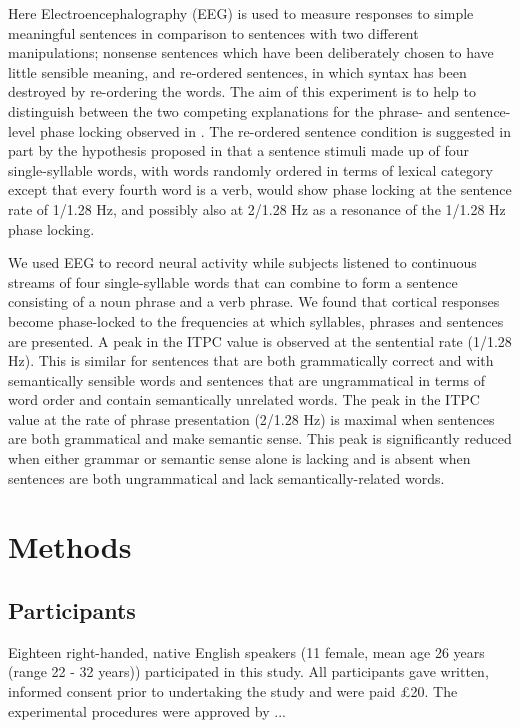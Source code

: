 \documentclass[10pt,letterpaper]{article}
\begin{document}
Here Electroencephalography (EEG) is used to measure responses to
simple meaningful sentences in comparison to sentences with two different
manipulations; nonsense sentences which have been deliberately chosen
to have little sensible meaning, and re-ordered sentences, in which
syntax has been destroyed by re-ordering the words. The aim of this
experiment is to help to distinguish between the two competing
explanations for the phrase- and sentence-level phase locking observed
in \cite{DingEtAl2016,DingEtAl2017}. The re-ordered sentence condition
is suggested in part by the hypothesis proposed in
\cite{FrankYang2018} that a sentence stimuli made up of four
single-syllable words, with words randomly ordered in terms of lexical
category except that every fourth word is a verb, would show phase
locking at the sentence rate of 1/1.28 Hz, and possibly also at 2/1.28
Hz as a resonance of the 1/1.28 Hz phase locking.



We used EEG to record neural activity while subjects listened to continuous streams of four single-syllable words that can combine to form a sentence consisting of a noun phrase and a verb phrase. We found that cortical responses become
phase-locked to the frequencies at which syllables, phrases and
sentences are presented. A peak in the ITPC value is observed at the sentential rate
(1/1.28 Hz). This is similar for sentences that are both grammatically correct and with semantically sensible words and sentences that are
ungrammatical in terms of word order and contain semantically
 unrelated words. The peak in the ITPC value at the rate of phrase presentation
 (2/1.28 Hz) is maximal when sentences are both grammatical and make
 semantic sense. This peak is significantly reduced when either grammar or
 semantic sense alone is lacking and is absent when sentences are both ungrammatical and
 lack semantically-related words. 


\section*{Methods}
\subsection*{Participants}

Eighteen right-handed, native English speakers (11 female, mean age 26
years (range 22 - 32 years)) participated in this study. All
participants gave written, informed consent prior to undertaking the
study and were paid £20. The experimental procedures were approved by
...
\end{document}
